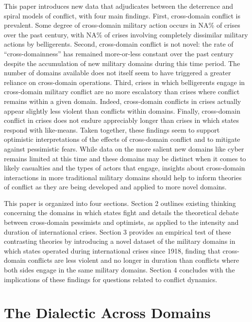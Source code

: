 \documentclass[
]{article}
\begin{document}
This paper introduces new data that adjudicates between the deterrence and spiral models of conflict, with four main findings. First, cross-domain conflict is prevalent. Some degree of cross-domain military action occurs in NA\% of crises over the past century, with NA\% of crises involving completely dissimilar military actions by belligerents. Second, cross-domain conflict is not novel: the rate of ``cross-domainness'' has remained more-or-less constant over the past century despite the accumulation of new military domains during this time period. The number of domains available does not itself seem to have triggered a greater reliance on cross-domain operations. Third, crises in which belligerents engage in cross-domain military conflict are no more escalatory than crises where conflict remains within a given domain. Indeed, cross-domain conflicts in crises actually appear slightly less violent than conflicts within domains. Finally, cross-domain conflict in crises does not endure appreciably longer than crises in which states respond with like-means. Taken together, these findings seem to support optimistic interpretations of the effects of cross-domain conflict and to mitigate against pessimistic fears. While data on the more salient new domains like cyber remains limited at this time and these domains may be distinct when it comes to likely casualties and the types of actors that engage, insights about cross-domain interactions in more traditional military domains should help to inform theories of conflict as they are being developed and applied to more novel domains.

This paper is organized into four sections. Section 2 outlines existing thinking concerning the domains in which states fight and details the theoretical debate between cross-domain pessimists and optimists, as applied to the intensity and duration of international crises. Section 3 provides an empirical test of these contrasting theories by introducing a novel dataset of the military domains in which states operated during international crises since 1918, finding that cross-domain conflicts are less violent and no longer in duration than conflicts where both sides engage in the same military domains. Section 4 concludes with the implications of these findings for questions related to conflict dynamics.

\hypertarget{the-dialectic-across-domains}{%
\section{The Dialectic Across Domains}\label{the-dialectic-across-domains}}
\end{document}
